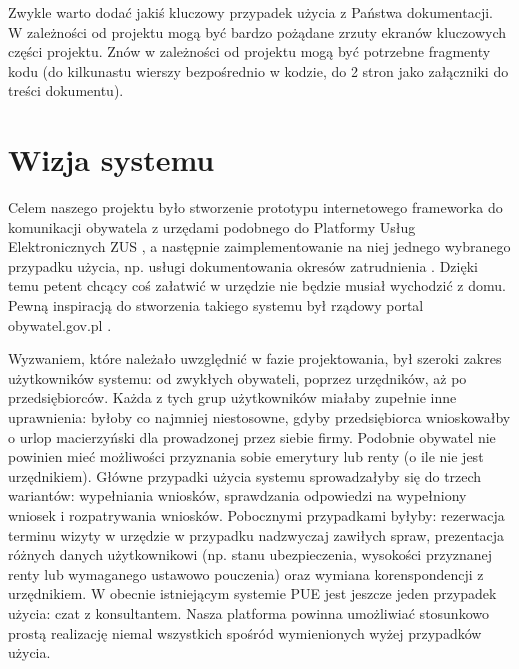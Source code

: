 \documentclass[licencjacka]{pracamgr}
\begin{document}
Zwykle warto dodać jakiś kluczowy przypadek użycia z Państwa dokumentacji. W zależności od projektu mogą być bardzo pożądane zrzuty ekranów kluczowych części projektu. Znów w zależności od projektu mogą być potrzebne fragmenty kodu (do kilkunastu wierszy bezpośrednio w kodzie, do 2 stron jako załączniki do treści dokumentu).



\chapter{Wizja systemu}\label{r:wizja}

Celem naszego projektu było stworzenie prototypu internetowego frameworka do komunikacji obywatela z urzędami
podobnego do Platformy Usług Elektronicznych ZUS \cite{zuspue}, a następnie zaimplementowanie na niej jednego
wybranego przypadku użycia, np. usługi dokumentowania okresów zatrudnienia \cite{zusdoz}. Dzięki temu petent chcący
coś załatwić w urzędzie nie będzie musiał wychodzić z domu. Pewną inspiracją do stworzenia takiego systemu był
rządowy portal obywatel.gov.pl \cite{mcobywatel}.

Wyzwaniem, które należało uwzględnić w fazie projektowania, był szeroki zakres użytkowników systemu: od zwykłych
obywateli, poprzez urzędników, aż po przedsiębiorców. Każda z tych grup użytkowników miałaby zupełnie inne uprawnienia:
byłoby co najmniej niestosowne, gdyby przedsiębiorca wnioskowałby o urlop macierzyński dla prowadzonej przez siebie
firmy. Podobnie obywatel nie powinien mieć możliwości przyznania sobie emerytury lub renty (o ile nie jest urzędnikiem). Główne przypadki użycia systemu sprowadzałyby się do trzech wariantów: wypełniania wniosków, sprawdzania
odpowiedzi na wypełniony wniosek i rozpatrywania wniosków. Pobocznymi przypadkami byłyby: rezerwacja terminu wizyty w
urzędzie w przypadku nadzwyczaj zawiłych spraw, prezentacja różnych danych użytkownikowi (np. stanu ubezpieczenia,
wysokości przyznanej renty lub wymaganego ustawowo pouczenia) oraz wymiana korenspondencji z urzędnikiem. W obecnie
istniejącym systemie PUE jest jeszcze jeden przypadek użycia: czat z konsultantem. Nasza platforma powinna umożliwiać
stosunkowo prostą realizację niemal wszystkich spośród wymienionych wyżej przypadków użycia.
\end{document}
